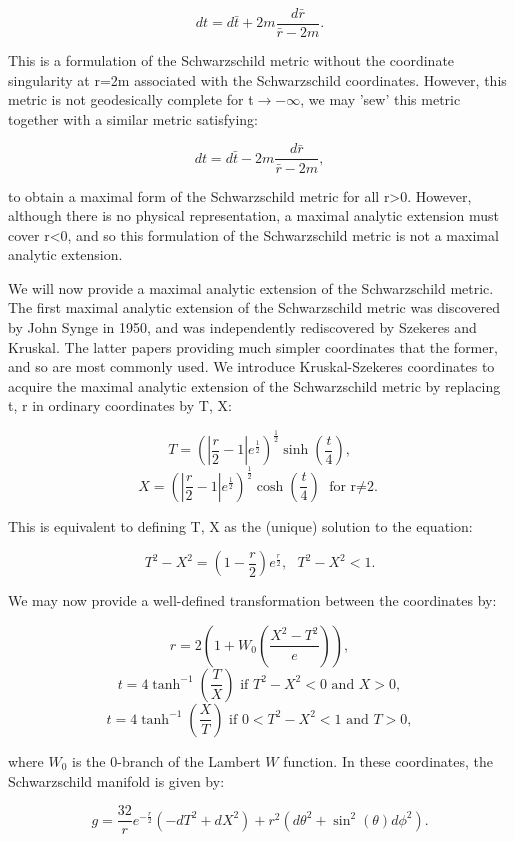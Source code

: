 \documentclass[oneside,openright,frontopenright, singlespacing]{dmathesis}
\begin{document}
	\[dt = d\bar{t}+2m\frac{d\bar{r}}{\bar{r}-2m}.\]

	This is a formulation of the Schwarzschild metric without the coordinate singularity at r=2m associated with the Schwarzschild coordinates. However, this metric is not geodesically complete for t$\rightarrow-\infty$, we may 'sew' this metric together with a similar metric satisfying:

	\[dt = d\bar{t}-2m\frac{d\bar{r}}{\bar{r}-2m},\]

	to obtain a maximal form of the Schwarzschild metric for all r>0. However, although there is no physical representation, a maximal analytic extension must cover r<0, and so this formulation of the Schwarzschild metric is not a maximal analytic extension.

\vspace{1em}
	We will now provide a maximal analytic extension of the Schwarzschild metric. The first maximal analytic extension of the Schwarzschild metric was discovered by John Synge in 1950\cite{synge1950gravitational}, and was independently rediscovered by Szekeres\cite{szekeres1960singularities} and Kruskal\cite{kruskal1960maximal}. The latter papers providing much simpler coordinates that the former, and so are most commonly used. We introduce Kruskal-Szekeres coordinates to acquire the maximal analytic extension of the Schwarzschild metric by replacing t, r in ordinary coordinates by T, X:

	\[T=(|\frac{r}{2}-1|e^{\frac{1}{2}})^{\frac{1}{2}}\sinh\left(\frac{t}{4}\right),\]
	\[X=(|\frac{r}{2}-1|e^{\frac{1}{2}})^{\frac{1}{2}}\cosh\left(\frac{t}{4}\right) \mbox{ for r$\neq$2.}\]

	This is equivalent to defining T, X as the (unique) solution to the equation:

	\[T^2-X^2 = \left(1-\frac{r}{2}\right)e^{\frac{r}{2}},\mbox{ } T^2-X^2<1.\]

	We may now provide a well-defined transformation between the coordinates by:

	\[r = 2\left(1+W_0\left(\frac{X^2-T^2}{e}\right)\right),\]
	\[t = 4\tanh^{-1}\left(\frac{T}{X}\right) \mbox{ if }T^2-X^2<0 \mbox{ and } X>0,\]
	\[t = 4\tanh^{-1}\left(\frac{X}{T}\right) \mbox{ if }0<T^2-X^2<1 \mbox{ and } T>0,\]

	where $W_0$ is the 0-branch of the Lambert $W$ function. In these coordinates, the Schwarzschild manifold is given by:

	\[g = \frac{32}{r}e^{-\frac{r}{2}}(-dT^2+dX^2)+r^2(d\theta^2+\sin^2(\theta)d\phi^2).\]
\end{document}

